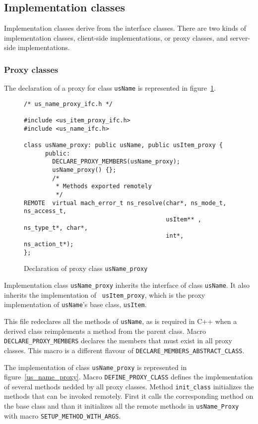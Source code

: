 \subsection{Implementation classes}

Implementation classes derive from the interface classes. There are two
kinds of implementation classes, client-side implementations, or proxy
classes, and server-side implementations.

\subsubsection{Proxy classes}

The declaration of a proxy for class {\tt usName} is represented in 
figure~\ref{us_name_proxy_ifc}.

\begin{figure}[htbp]
{\footnotesize
\begin{verbatim}
/* us_name_proxy_ifc.h */

#include <us_item_proxy_ifc.h>
#include <us_name_ifc.h>

class usName_proxy: public usName, public usItem_proxy {
      public:
        DECLARE_PROXY_MEMBERS(usName_proxy);
        usName_proxy() {};
        /*
         * Methods exported remotely
         */
REMOTE  virtual mach_error_t ns_resolve(char*, ns_mode_t, ns_access_t, 
                                        usItem** , ns_type_t*, char*, 
                                        int*, ns_action_t*);
};

\end{verbatim}
}
\caption{Declaration of proxy class {\tt usName\_proxy}}
\label{us_name_proxy_ifc}
\end{figure}

Implementation class {\tt usName\_proxy} inherits the interface of
class {\tt usName}. It also inherits the implementation of {\tt
usItem\_proxy}, which is the proxy implementation of {\tt usName}'s
base class, {\tt usItem}.

This file redeclares all the methods of {\tt usName}, as is required
in C++ when a derived class reimplements a method from the parent
class. Macro {\tt DECLARE\_PROXY\_MEMBERS} declares the members that
must exist in all proxy classes. This macro is a different flavour of
{\tt DECLARE\_MEMBERS\_ABSTRACT\_CLASS}.

The implementation of class {\tt usName\_proxy} is represented in
figure~\ref{us_name_proxy}. Macro {\tt DEFINE\_PROXY\_CLASS} defines
the implementation of several methods nedded by all proxy classes.
Method {\tt init\_class} initializes the methods that can be invoked
remotely. First it calls the corresponding method on the base class
and than it initializes all the remote methods in {\tt usName\_Proxy}
with macro {\tt SETUP\_METHOD\_WITH\_ARGS}.

